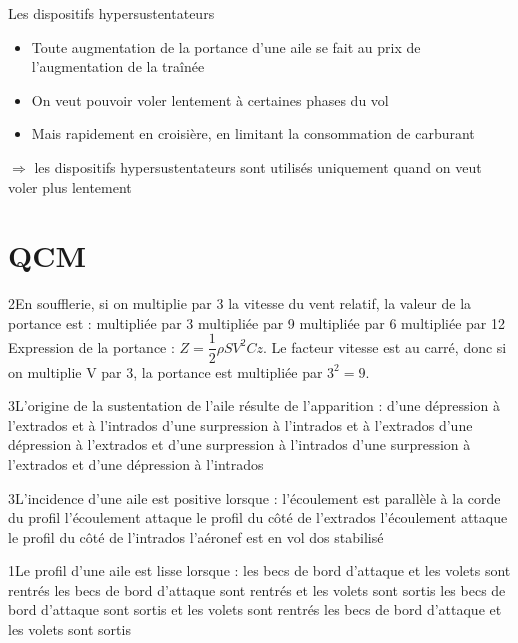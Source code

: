 	\begin{frame}{Les dispositifs hypersustentateurs}
	
	\pause
	
	\begin{itemize}
		\item Toute augmentation de la portance d'une aile se fait au prix de l'augmentation de la traînée
		\pause
		\item On veut pouvoir voler lentement à certaines phases du vol
		\pause
		\item Mais rapidement en croisière, en limitant la consommation de carburant
	\end{itemize}
	\pause
	$\Rightarrow$ les dispositifs hypersustentateurs sont utilisés uniquement quand on veut voler plus lentement
	
	\end{frame}
 
 
\appendix 
\section{QCM}
{2}{En soufflerie, si on multiplie par 3 la vitesse du vent relatif, la valeur de la portance est :}
{multipliée par 3}
{multipliée par 9}
{multipliée par 6}
{multipliée par 12} 
{Expression de la portance : $Z = \dfrac{1}{2}\rho S V^2 Cz$. Le facteur vitesse est au carré, donc si on multiplie V par 3, la portance est multipliée par $3^2 = 9$.}

{3}{L'origine de la sustentation de l'aile résulte de l'apparition :}
{d'une dépression à l'extrados et à l'intrados}
{d'une surpression à l'intrados et à l'extrados}
{d'une dépression à l'extrados et d'une surpression à l'intrados}
{d'une surpression à l'extrados et d'une dépression à l'intrados} 
{}

{3}{L'incidence d'une aile est positive lorsque :}
{l'écoulement est parallèle à la corde du profil}
{l'écoulement attaque le profil du côté de l'extrados}
{l'écoulement attaque le profil du côté de l'intrados}
{l'aéronef est en vol dos stabilisé} 
{}

{1}{Le profil d'une aile est lisse lorsque :}
{les becs de bord d'attaque et les volets sont rentrés}
{les becs de bord d'attaque sont rentrés et les volets sont sortis}
{les becs de bord d'attaque sont sortis et les volets sont rentrés}
{les becs de bord d'attaque et les volets sont sortis} 
{}

